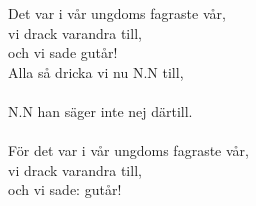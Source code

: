 \vspace{10pt}
Det var i vår ungdoms fagraste vår,\\
vi drack varandra till,\\
och vi sade gutår!\\
Alla så dricka vi nu N.N till,\\
\\
N.N han säger inte nej därtill.\\
\\
För det var i vår ungdoms fagraste vår,\\
vi drack varandra till,\\
och vi sade: gutår!
